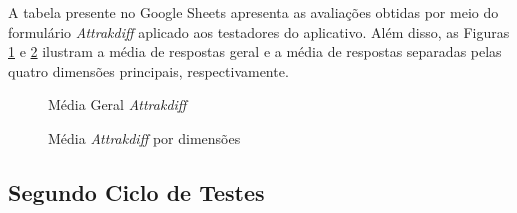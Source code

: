 A tabela presente no Google Sheets apresenta as avaliações obtidas por meio do formulário \textit{Attrakdiff} aplicado aos testadores do aplicativo. Além disso, as Figuras \ref{fig20} e \ref{fig21} ilustram a média de respostas geral e a média 
de respostas separadas pelas quatro dimensões principais, respectivamente.

\begin{figure}[h!]
	\centering
	\caption{Média Geral \textit{Attrakdiff}}
	\label{fig20}
\end{figure}

\begin{figure}[h!]
	\centering
	\caption{Média \textit{Attrakdiff} por dimensões}
	\label{fig21}
\end{figure}

\subsection{Segundo Ciclo de Testes}
\label{sec:Segundo Ciclo}
